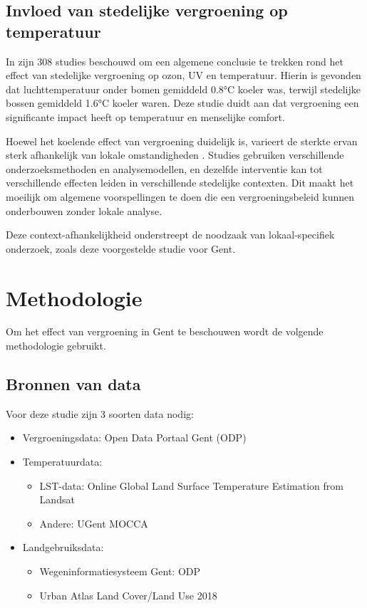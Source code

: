 \subsection{Invloed van stedelijke vergroening op temperatuur}

In \textcite{Knight2021} zijn 308 studies beschouwd om een algemene conclusie te trekken 
rond het effect van stedelijke vergroening op ozon, UV en temperatuur.
Hierin is gevonden dat luchttemperatuur onder bomen gemiddeld 0.8°C koeler was, 
terwijl stedelijke bossen gemiddeld 1.6°C koeler waren.
Deze studie duidt aan dat vergroening een significante impact heeft op temperatuur en menselijke comfort.

Hoewel het koelende effect van vergroening duidelijk is, 
varieert de sterkte ervan sterk afhankelijk van lokale omstandigheden \autocite{Gao2025, Kim2021}. 
Studies gebruiken verschillende onderzoeksmethoden en analysemodellen, 
en dezelfde interventie kan tot verschillende effecten leiden in verschillende stedelijke contexten. 
Dit maakt het moeilijk om algemene voorspellingen te doen die een vergroeningsbeleid kunnen onderbouwen zonder lokale analyse.

Deze context-afhankelijkheid onderstreept de noodzaak van lokaal-specifiek onderzoek, zoals deze voorgestelde studie voor Gent.

\section{Methodologie}%
\label{sec:methodologie}

Om het effect van vergroening in Gent te beschouwen wordt de volgende methodologie gebruikt.

\subsection{Bronnen van data}

Voor deze studie zijn 3 soorten data nodig:

\begin{itemize}
    \item Vergroeningsdata: Open Data Portaal Gent (ODP) \autocite{StadGentBomen}
    \item Temperatuurdata:
    \begin{itemize}
        \item LST-data: Online Global Land Surface Temperature Estimation from Landsat \autocite{Parastatidis2017}
        \item Andere: UGent MOCCA
    \end{itemize}
    \item Landgebruiksdata:
    \begin{itemize}
        \item Wegeninformatiesysteem Gent: ODP
        \item Urban Atlas Land Cover/Land Use 2018
    \end{itemize}
\end{itemize}

